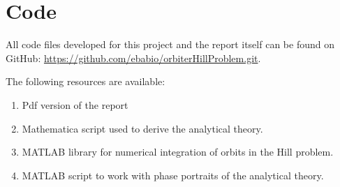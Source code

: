 \section{Code} \label{annexCode}

All code files developed for this project and the report itself can be found on GitHub: \url{https://github.com/ebabio/orbiterHillProblem.git}.

The following resources are available:
\begin{enumerate}
	\item Pdf version of the report
	
	\item Mathematica script used to derive the analytical theory.
	
	\item MATLAB library for numerical integration of orbits in the Hill problem.
	
	\item MATLAB script to work with phase portraits of the analytical theory.
	
\end{enumerate}
